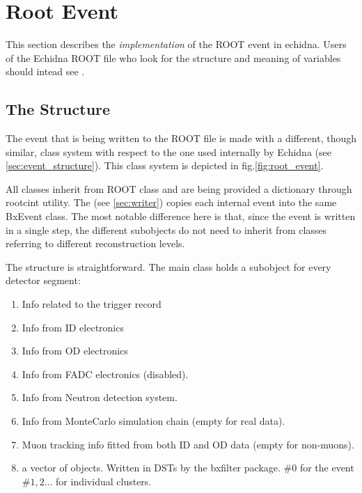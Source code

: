 \section{Root Event}
\label{sec:root_event}

This section describes the \emph{implementation} of the ROOT event in echidna.
Users of the Echidna ROOT file who look for the structure and meaning of variables should intead see . 

\subsection{The Structure}
\label{sec:root_struct}

The event that is being written to the ROOT file is made with a different, though similar, class system 
with respect to the one used internally by Echidna (see \ref{sec:event_structure}).
This class system is depicted in fig.\ref{fig:root_event}.

All classes inherit from  ROOT class and are being provided a dictionary through rootcint utility.
The  (see \ref{sec:writer}) copies each internal event into the same BxEvent class.
The most notable difference here is that, since the event is written in a single step,
the different subobjects do not need to inherit from classes referring to different reconstruction levels.

The structure is straightforward. The main class  holds a subobject for every detector segment:
\begin{enumerate}
\item {} Info related to the trigger record
\item {} Info from ID electronics
\item {} Info from OD electronics
\item {} Info from FADC electronics (disabled).
\item {} Info from Neutron detection system.
\item {} Info from MonteCarlo simulation chain (empty for real data).
\item {} Muon tracking info fitted from both ID and OD data (empty for non-muons).
\item a vector of  objects. Written in DSTs by the bxfilter package. $\#0$ for the event $\#1,2\ldots$ for individual clusters.
\end{enumerate}

